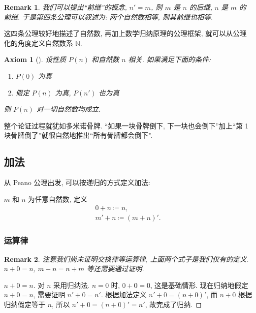 \documentclass[UTF8]{ctexart}
\theoremstyle{mystyle}
\newtheorem{axiom}{Axiom}[section]
\theoremstyle{myremark}
\newtheorem*{remark}{Remark}
\theoremstyle{plain}
\newcommand{\N}{\mathbb N}
\begin{document}
\begin{remark}
    我们可以提出``前继''的概念, $ n' = m $, 则 $ m $ 是 $ n $ 的后继, $ n $ 是 $ m $ 的前继. 于是第四条公理可以叙述为: 两个自然数相等, 则其前继也相等.
\end{remark}

这四条公理较好地描述了自然数, 再加上数学归纳原理的公理框架, 就可以从公理化的角度定义自然数系 $ \N $.

\begin{axiom}[]
    设性质 $ P(n) $ 和自然数 $ n $ 相关. 如果满足下面的条件:
    \begin{enumerate}
        \item $ P(0) $ 为真
        \item 假定 $ P(n) $ 为真, $ P(n') $ 也为真
    \end{enumerate}
    则 $ P(n) $ 对一切自然数均成立.
\end{axiom}

整个论证过程就犹如多米诺骨牌. ``如果一块骨牌倒下, 下一块也会倒下''加上``第 1 块骨牌倒了''就很自然地推出``所有骨牌都会倒下''.



\subsection{加法}
从 Peano 公理出发, 可以按递归的方式定义加法:
\begin{definition}
    $ m $ 和 $ n $ 为任意自然数, 定义 \[ 
        \begin{array}{c}
            0 + n \coloneqq n, \\
            m' + n \coloneqq (m + n)'.
        \end{array}    
    \]
\end{definition}

\subsubsection{运算律}
\begin{remark}
    注意我们尚未证明交换律等运算律, 上面两个式子是我们仅有的定义. $ n + 0 = n $, $ m + n = n + m $ 等还需要通过证明.
\end{remark}

\begin{proof}[ $ n + 0 = n $]
    对 $ n $ 采用归纳法. $ n = 0 $ 时, $ 0 + 0 = 0 $, 这是基础情形. 现在归纳地假定 $ n + 0 = n $, 需要证明 $ n' + 0 = n' $. 根据加法定义 $ n' + 0 = (n + 0)' $, 而 $ n + 0 $ 根据归纳假定等于 $ n $, 所以 $ n' + 0 = (n + 0)' = n' $, 故完成了归纳.
\end{proof}
\end{document}
